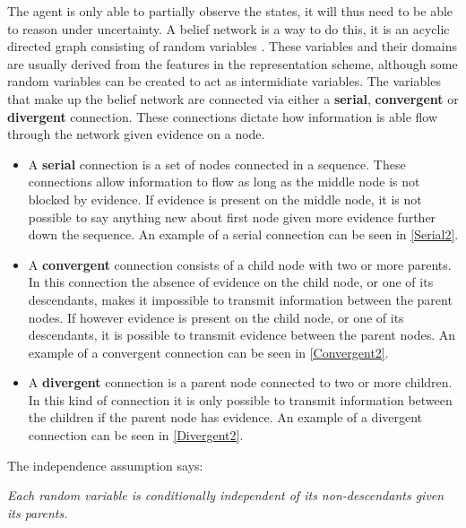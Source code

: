 The agent is only able to partially observe the states, it will thus need to be
able to reason under uncertainty. A belief network is a way to do this, it is an acyclic
directed graph consisting of random variables \citep[ch.6.3]{MIBook}. These
variables and their domains are usually derived from the features in the representation scheme, although
some random variables can be created to act as intermidiate variables. The
variables that make up the belief network are connected via either a
\textbf{serial}, \textbf{convergent} or \textbf{divergent} connection. These
connections dictate how information is able flow through the network given
evidence on a node.
\begin{itemize}
  \item A \textbf{serial} connection is a set of nodes connected in a sequence.
  These connections allow information to flow as long as the middle node is not
  blocked by evidence. If evidence is present on the middle node, it is not
  possible to say anything new about first node given more evidence further down
  the sequence. An example of a serial connection can be seen in
  \autoref{Serial2}.
  \item A \textbf{convergent} connection consists of a child node with two or
  more parents. In this connection the absence of evidence on the child node, or
  one of its descendants, makes it impossible to transmit information between
  the parent nodes. If however evidence is present on the child node, or one of
  its descendants, it is possible to transmit evidence between the
  parent nodes. An example of a convergent connection can be seen in
 \autoref{Convergent2}.
  \item A \textbf{divergent} connection is a parent node connected to two or
  more children. In this kind of connection it is only possible to transmit
  information between the children if the parent node has evidence. An
  example of a divergent connection can be seen in \autoref{Divergent2}.
\end{itemize}

The independence assumption \citep[p.240]{MIBook} says:

\begin{center}
\begin{minipage}{0.8\linewidth}
\textit{Each random variable is conditionally independent of its non-descendants
given its parents.}
\end{minipage}
\end{center}

